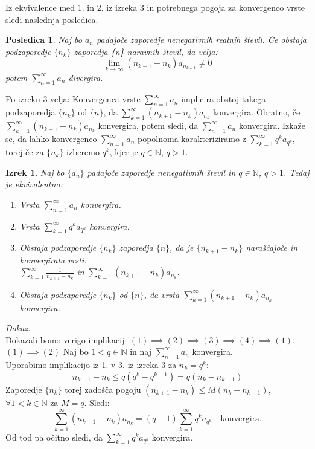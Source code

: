 \documentclass[a4paper,12pt]{article}
\def\N{\mathbb{N}} %
\newtheorem{izrek}{Izrek}
\newtheorem{posledica}{Posledica}
\begin{document}
Iz ekvivalence med 1. in 2. iz izreka 3 in potrebnega pogoja za konvergenco vrste sledi naslednja posledica.
\begin{posledica}
    Naj bo ${a_n}$ padajoče zaporedje nenegativnih realnih števil.
    Če obstaja podzaporedje $\{n_k\}$ zaporedja \{n\} naravnih števil, da velja:
    \[
        \lim_{k \to \infty} (n_{k+1} - n_k)a_{n_{k+1}} \neq 0 
    \] 
    potem $\sum_{n = 1}^{\infty}{a_n}$ divergira.
\end{posledica}

Po izreku 3 velja: 
Konvergenca vrste $\sum_{n = 1}^{\infty}{a_n}$ implicira obstoj takega
podzaporedja $\{n_k\}$ od $\{n\}$, da $\sum_{k = 1}^{\infty}{(n_{k+1} - n_k)a_{n_{k}}}$ konvergira.
Obratno, če $\sum_{k = 1}^{\infty}{(n_{k+1} - n_k)a_{n_{k}}}$ konvergira, potem sledi, da 
$\sum_{n = 1}^{\infty}{a_n}$ konvergira.
Izkaže se, da lahko konvergenco $\sum_{n = 1}^{\infty}{a_n}$ popolnoma karakteriziramo
z $\sum_{k = 1}^{\infty}{q^ka_{q^k}}$, torej če za $\{n_k\}$ izberemo ${q^k}$, kjer je $q \in \N$, $q > 1$.

\begin{izrek}
    Naj bo $\{a_n\}$ padajoče zaporedje nenegativnih števil in $ q \in {\mathbb{N}}$, $q > 1$. Tedaj je ekvivalentno:
    \begin{enumerate}
        \item Vrsta $\sum_{n = 1}^{\infty}{a_n}$ konvergira.
        \item Vrsta $\sum_{k = 1}^{\infty}{q^ka_{q^k}}$ konvergira.
        \item Obstaja podzaporedje $\{n_k\}$ zaporedja $\{n\}$, da je $\{n_{k+1} - n_k\}$ 
        naraščajoče in konvergirata vrsti:\\
        $\sum_{k = 1}^{\infty}{\frac{1}{n_{k+1} - n_k}}$ in 
        $\sum_{k = 1}^{\infty}{(n_{k+1} - n_k)a_{n_k}}$. 
        \item Obstaja podzaporedje $\{n_k\}$ od $\{n\}$, da vrsta $\sum_{k = 1}^{\infty}{(n_{k+1} - n_k)a_{n_k}}$ konvergira.
    \end{enumerate}
\end{izrek}   

\noindent
{\em Dokaz:\/} \\Dokazali bomo verigo implikacij. $ (1)\implies (2)\implies (3) \implies (4)\implies(1)$.
$(1) \implies (2)$ Naj bo $ 1 < q \in \N$ in naj $\sum_{n = 1}^{\infty}{a_n}$ konvergira.\\
    Uporabimo implikacijo iz 1. v 3. iz izreka 3 za $n_k = q^k$:\\
    \[
        n_{k+1} - n_k \leq q(q^k - q^{k-1}) = q(n_{k} - n_{k - 1})
    \]
    Zaporedje $\{n_k\}$ torej zadošča pogoju $(n_{k+1} - n_k) \leq M(n_k - n_{k - 1})$,
    $\forall 1 < k \in \N$ za $M = q$.
    Sledi:
    \[
        \sum_{k = 1}^{\infty}{(n_{k+1} - n_k)a_{n_k}} = (q-1)\sum_{k = 1}^{\infty}{q^ka_{q^k}} 
        \quad \text{konvergira.}
    \]
    Od tod pa očitno sledi, da $\sum_{k = 1}^{\infty}{q^ka_{q^k}}$ konvergira.
\end{document}

